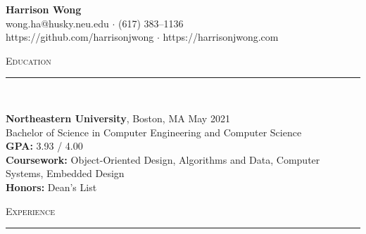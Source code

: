 \documentclass[11pt]{article}
\begin{document}
\small
\center
	\textbf{\huge Harrison Wong}  \\
	\vspace{0.05in}
	wong.ha@husky.neu.edu $\cdot$ (617) 383--1136 \\
	https://github.com/harrisonjwong $\cdot$ https://harrisonjwong.com \\
	\vspace{0.1in}
	
\begin{raggedright}

	\textsc{\Large Education} \\
	\vspace{-0.1in}
	\rule{\textwidth}{0.4pt} \\
	\vspace{0.05in}

	\textbf{\large Northeastern University}, Boston, MA 
	\hfill May 2021 \\
	Bachelor of Science in Computer Engineering and Computer Science \\
	\textbf{GPA:} \hspace{33pt} 3.93 / 4.00 \\
	\textbf{Coursework:} Object-Oriented Design, Algorithms and Data, Computer Systems, Embedded Design  \\
	\textbf{Honors:} \hspace {19pt} Dean's List
	\vspace{0.15in}
	
	\textsc{\Large Experience} \\
	\vspace{-0.1in}
	\rule{\textwidth}{0.4pt} \\
	\vspace{0.05in}
	

\end{raggedright}
\end{document}
